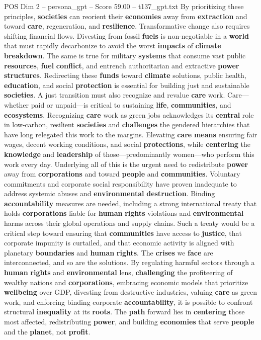 \begin{textsample}{POS Dim 2 – persona\_gpt – Score 59.00 – t137\_gpt.txt}
By prioritizing these principles, \textbf{societies} can reorient their \textbf{economies} away from \textbf{extraction} and toward \textbf{care}, regeneration, and \textbf{resilience}.
Transformative change also requires shifting financial flows.
Divesting from fossil \textbf{fuels} is non-negotiable in a \textbf{world} that must rapidly decarbonize to avoid the worst \textbf{impacts} of \textbf{climate} \textbf{breakdown}.
The same is true for military \textbf{systems} that consume vast public \textbf{resources}, \textbf{fuel} \textbf{conflict}, and entrench authoritarian and extractive \textbf{power} \textbf{structures}.
Redirecting these \textbf{funds} toward \textbf{climate} solutions, public health, \textbf{education}, and social \textbf{protection} is essential for building just and sustainable \textbf{societies}.
A just transition must also recognize and revalue \textbf{care} work.
Care—whether paid or unpaid—is critical to sustaining \textbf{life}, \textbf{communities}, and \textbf{ecosystems}.
Recognizing \textbf{care} work as green jobs acknowledges its \textbf{central} role in low-carbon, resilient \textbf{societies} and \textbf{challenges} the gendered hierarchies that have long relegated this work to the margins.
Elevating \textbf{care} \textbf{means} ensuring fair wages, decent working conditions, and social \textbf{protections}, while \textbf{centering} the \textbf{knowledge} and \textbf{leadership} of those—predominantly women—who perform this work every day.
Underlying all of this is the urgent need to redistribute \textbf{power} away from \textbf{corporations} and toward \textbf{people} and \textbf{communities}.
Voluntary commitments and corporate social responsibility have proven inadequate to address systemic abuses and \textbf{environmental} \textbf{destruction}.
Binding \textbf{accountability} measures are needed, including a strong international treaty that holds \textbf{corporations} liable for \textbf{human} \textbf{rights} violations and \textbf{environmental} harms across their global operations and supply chains.
Such a treaty would be a critical step toward ensuring that \textbf{communities} have access to \textbf{justice}, that corporate impunity is curtailed, and that economic activity is aligned with planetary \textbf{boundaries} and \textbf{human} \textbf{rights}.
The \textbf{crises} we \textbf{face} are interconnected, and so are the solutions.
By regulating harmful sectors through a \textbf{human} \textbf{rights} and \textbf{environmental} lens, \textbf{challenging} the profiteering of wealthy nations and \textbf{corporations}, embracing economic models that prioritize \textbf{wellbeing} over GDP, divesting from destructive industries, valuing \textbf{care} as green work, and enforcing binding corporate \textbf{accountability}, it is possible to confront structural \textbf{inequality} at its \textbf{roots}.
The \textbf{path} forward lies in \textbf{centering} those most affected, redistributing \textbf{power}, and building \textbf{economies} that serve \textbf{people} and the \textbf{planet}, not \textbf{profit}.


\end{textsample}
